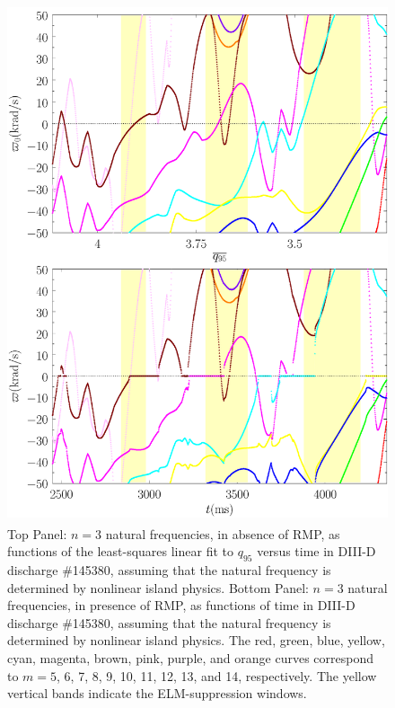 \documentclass[12pt,prb,aps]{revtex4-1}
\begin{document}
\begin{figure}
\includegraphics[height=6in]{fig5.pdf}
\caption{Top Panel: $n=3$ natural frequencies, in absence of RMP, as functions of the least-squares linear fit to $q_{95}$ versus time
in   DIII-D discharge \#145380, assuming that the natural frequency is determined by nonlinear island physics.
Bottom Panel:  $n=3$ natural frequencies, in presence of RMP, as functions of time
in   DIII-D discharge \#145380, assuming that the natural frequency is determined by nonlinear island physics. The red, green, blue, yellow, cyan, magenta, brown, pink,
purple, and orange  curves correspond to $m=5$, 6, 7, 8, 9, 10, 11, 12, 13, and 14, respectively. The yellow vertical bands indicate the ELM-suppression windows.} \label{fig5}
\end{figure}
\end{document}
